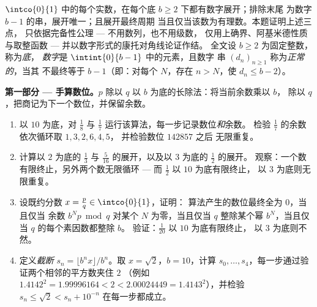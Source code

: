 \begin{problem}
\label{pb:b1:reals:1}
$\intco{0}{1}$ 中的每个实数，在每个底
$b \geq 2$ 下都有数字展开；排除末尾
为数字 $b - 1$ 的串，展开唯一；且展开最终周期
当且仅当该数为有理数。本题证明上述三点，
只依据完备性公理 --- 不用数列，也不用级数，
仅用上确界、阿基米德性质与取整函数
--- 并以数字形式的康托对角线论证作结。
全文设 $b \geq 2$ 为固定整数，称为\emph{底}，
\emph{数字}是 $\intint{0}{b-1}$ 中的元素，且数字
串 $(d_n)_{n \geq 1}$ 称为\emph{正常的}，当其
不最终等于 $b - 1$（即：对每个 $N$，存在 $n >
N$，使 $d_n \leq b - 2$）。

\medskip
\noindent\textbf{第一部分 --- 手算数位。}$p$ 除以
$q$ 以 $b$ 为底的长除法：将当前余数乘以 $b$，
除以 $q$，把商记为下一个数位，并保留余数。
\begin{enumerate}
  \item 以 $10$ 为底，对 $\frac 18$ 与
        $\frac 17$ 运行该算法，每一步记录数位\emph{和}余数。
        检验 $\frac 17$ 的余数依次循环取 $1, 3, 2, 6, 4, 5$，
        并检验数位 $142857$ 之后
        无限重复。
  \item 计算以 $2$ 为底的 $\frac 13$ 与
        $\frac{5}{16}$ 的展开，以及以 $3$ 为底的 $\frac 12$ 的展开。
        观察：一个数有限终止，另外两个数无限循环 ---
        而 $\frac 12$ 以 $10$ 为底有限终止，
        以 $3$ 为底则无限重复。
  \item 设既约分数 $x = \frac pq \in \intco{0}{1}$，证明：
        算法产生的数位最终全为 $0$，当且仅当
        余数 $b^N p \bmod q$ 对某个 $N$ 为零，当且仅当
        $q$ 整除某个幂 $b^N$，当且仅当
        $q$ 的每个素因数都整除 $b$。
        验证：$\frac{1}{20}$ 以 $10$ 为底有限终止，
        以 $3$ 为底则不然。
  \item 定义\emph{截断} $s_n = \lfloor b^n x \rfloor
        / b^n$。取 $x = \sqrt 2$，$b = 10$，计算 $s_0,
        \dots, s_4$，每一步通过验证两个相邻的平方数夹住 $2$
        （例如 $1.4142^2
        = 1.99996164 < 2 < 2.00024449 = 1.4143^2$），并检验
        $s_n \leq \sqrt 2 < s_n + 10^{-n}$ 在每一步都成立。
\end{enumerate}


\end{problem}
